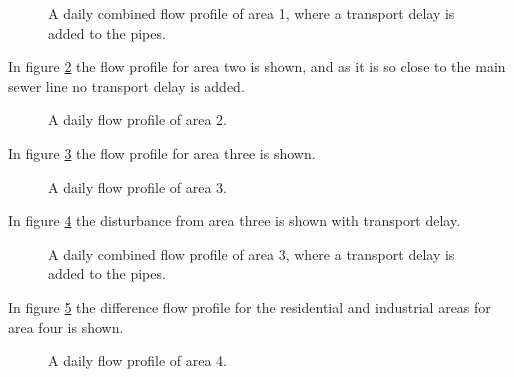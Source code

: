\begin{figure}[H]
\centering

\caption{A daily combined flow profile of area 1, where a transport delay is added to the pipes.}
\label{fig:flow_profile_zone_1_combined_with_delay}
\end{figure} 

In figure \ref{fig:APP_flow_profile_zone2} the flow profile for area two is shown, and as it is so close to the main sewer line no transport delay is added. 

\begin{figure}[H]
\centering

\caption{A daily flow profile of area 2.}
\label{fig:APP_flow_profile_zone2}
\end{figure} 

% 

In figure \ref{fig:APP_flow_profile_zone3} the flow profile for area three is shown.

\begin{figure}[H]
\centering

\caption{A daily flow profile of area 3.}
\label{fig:APP_flow_profile_zone3}
\end{figure} 

In figure \ref{fig:flow_profile_zone_3_combined_with_delay} the disturbance from area three is shown with transport delay. 

\begin{figure}[H]
\centering

\caption{A daily combined flow profile of area 3, where a transport delay is added to the pipes.}
\label{fig:flow_profile_zone_3_combined_with_delay}
\end{figure} 

In figure \ref{fig:APP_flow_profile_zone4} the difference flow profile for the residential and industrial areas for area four is shown.

\begin{figure}[H]
\centering

\caption{A daily flow profile of area 4.}
\label{fig:APP_flow_profile_zone4}
\end{figure} 

